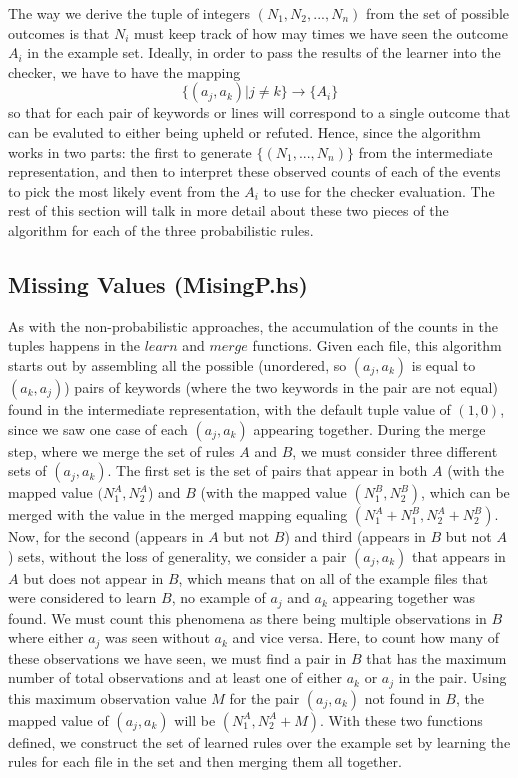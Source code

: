 \documentclass[12pt]{article}
\begin{document}
The way we derive the tuple of integers $(N_1, N_2, ..., N_n)$ from the set of possible outcomes is that $N_i$ must keep track of how may times we have seen the outcome $A_i$ in the example set. Ideally, in order to pass the results of the learner into the checker, we have to have the mapping
\[
\{ (a_j, a_k) | j \neq k \} \rightarrow \{ A_i \}
\]
so that for each pair of keywords or lines will correspond to a single outcome that can be evaluted to either being upheld or refuted. Hence, since the algorithm works in two parts: the first to generate $\{ (N_1, ..., N_n) \}$ from the intermediate representation, and then to interpret these observed counts of each of the events to pick the most likely event from the $A_i$ to use for the checker evaluation. The rest of this section will talk in more detail about these two pieces of the algorithm for each of the three probabilistic rules.

\subsection{Missing Values (MisingP.hs)}
As with the non-probabilistic approaches, the accumulation of the counts in the tuples happens in the $learn$ and $merge$ functions. Given each file, this algorithm starts out by assembling all the possible (unordered, so $(a_j,a_k)$ is equal to $(a_k,a_j)$) pairs of keywords (where the two keywords in the pair are not equal) found in the intermediate representation, with the default tuple value of $(1,0)$, since we saw one case of each $(a_j, a_k)$ appearing together. During the merge step, where we merge the set of rules $A$ and $B$, we must consider three different sets of $(a_j, a_k)$. The first set is the set of pairs that appear in both $A$ (with the mapped value $(N_1^A, N_2^A$) and $B$ (with the mapped value $(N_1^B, N_2^B)$, which can be merged with the value in the merged mapping equaling $(N_1^A + N_1^B, N_2^A + N_2^B)$. Now, for the second (appears in $A$ but not $B$) and third (appears in $B$ but not $A$) sets, without the loss of generality, we consider a pair $(a_j, a_k)$ that appears in $A$ but does not appear in $B$, which means that on all of the example files that were considered to learn $B$, no example of $a_j$ and $a_k$ appearing together was found. We must count this phenomena as there being multiple observations in $B$ where either $a_j$ was seen without $a_k$ and vice versa. Here, to count how many of these observations we have seen, we must find a pair in $B$ that has the maximum number of total observations and at least one of either $a_k$ or $a_j$ in the pair. Using this maximum observation value $M$ for the pair $(a_j, a_k)$ not found in $B$, the mapped value of $(a_j, a_k)$ will be $(N_1^A, N_2^A + M)$. With these two functions defined, we construct the set of learned rules over the example set by learning the rules for each file in the set and then merging them all together.
\end{document}
